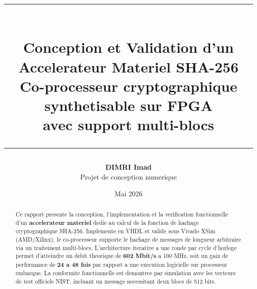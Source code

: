 \documentclass[12pt,a4paper]{article}
\title{%
\vspace{-1cm}
\rule{\textwidth}{1.5pt}\\[0.4cm]
{\Huge\bfseries Conception et Validation d'un\\Accelerateur Materiel SHA-256}\\[0.3cm]
{\Large Co-processeur cryptographique synthetisable sur FPGA\\
avec support multi-blocs}\\[0.2cm]
\rule{\textwidth}{1.5pt}
}
\author{\textbf{DIMRI Imad}\\[0.2cm]\small Projet de conception numerique}
\date{Mai 2026}
\begin{document}
\maketitle
\thispagestyle{empty}

\begin{abstract}
\noindent
Ce rapport presente la conception, l'implementation et la verification
fonctionnelle d'un \textbf{accelerateur materiel} dedie au calcul de la
fonction de hachage cryptographique SHA-256. Implemente en VHDL et valide
sous Vivado XSim (AMD/Xilinx), le co-processeur supporte le hachage de
messages de longueur arbitraire via un traitement multi-blocs. L'architecture
iterative a une ronde par cycle d'horloge permet d'atteindre un debit
theorique de \textbf{602 Mbit/s} a 100 MHz, soit un gain de performance de
\textbf{24 a 48 fois} par rapport a une execution logicielle sur processeur
embarque. La conformite fonctionnelle est demontree par simulation avec les
vecteurs de test officiels NIST, incluant un message necessitant deux blocs
de 512 bits.
\end{abstract}

\vspace{0.5cm}
\tableofcontents
\newpage











\end{document}
